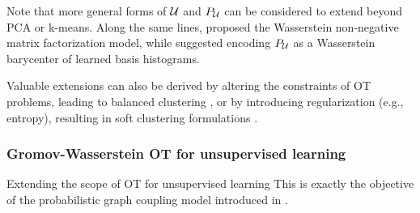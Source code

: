 Note that more general forms of ${\mathcal{U}}$ and $P_{{\mathcal{U}}}$ can be considered to extend beyond PCA or k-means. Along the same lines, \citep{sandler2011nonnegative} proposed the Wasserstein non-negative matrix factorization model, while \citep{schmitz2018wasserstein} suggested encoding $P_{{\mathcal{U}}}$ as a Wasserstein barycenter of learned basis histograms.

Valuable extensions can also be derived by altering the constraints of OT problems, leading to balanced clustering \citep{de2023balanced}, or by introducing regularization (e.g., entropy), resulting in soft clustering formulations \citep{ferraro2020soft}.

\subsubsection{Gromov-Wasserstein OT for unsupervised learning}



\begin{prob}{Extending the scope of OT for unsupervised learning}\label{prob:ot_unsupervised}
    This is exactly the objective of the probabilistic graph coupling model introduced in .
\end{prob}
